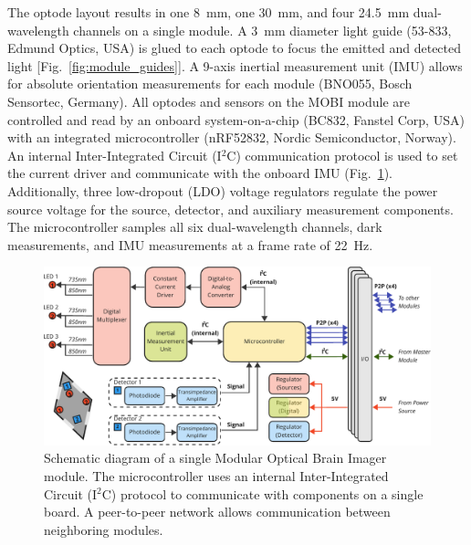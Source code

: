The optode layout results in one 8~mm, one 30~mm, and four 24.5~mm dual-wavelength channels on a single module. A 3~mm diameter light guide (53-833, Edmund Optics, USA) is glued to each optode to focus the emitted and detected light [Fig.~\ref{fig:module_guides}]. A 9-axis inertial measurement unit (IMU) allows for absolute orientation measurements for each module (BNO055, Bosch Sensortec, Germany). All optodes and sensors on the \ac{MOBI} module are controlled and read by an onboard system-on-a-chip (BC832, Fanstel Corp, USA) with an integrated microcontroller (nRF52832, Nordic Semiconductor, Norway). An internal Inter-Integrated Circuit (I$^2$C) communication protocol is used to set the current driver and communicate with the onboard IMU (Fig.~\ref{fig:architecture_mobi}). Additionally, three low-dropout (LDO) voltage regulators regulate the power source voltage for the source, detector, and auxiliary measurement components. The microcontroller samples all six dual-wavelength channels, dark measurements, and IMU measurements at a frame rate of 22~Hz. 

\begin{figure}
	\begin{center}
	    \includegraphics[width=\textwidth]{fig/mobi/architecture_mobi.pdf}
	\end{center}
	\caption{Schematic diagram of a single Modular Optical Brain Imager module. The microcontroller uses an internal Inter-Integrated Circuit (I$^2$C) protocol to communicate with components on a single board. A peer-to-peer network allows communication between neighboring modules. } 
	\label{fig:architecture_mobi}
\end{figure} 


